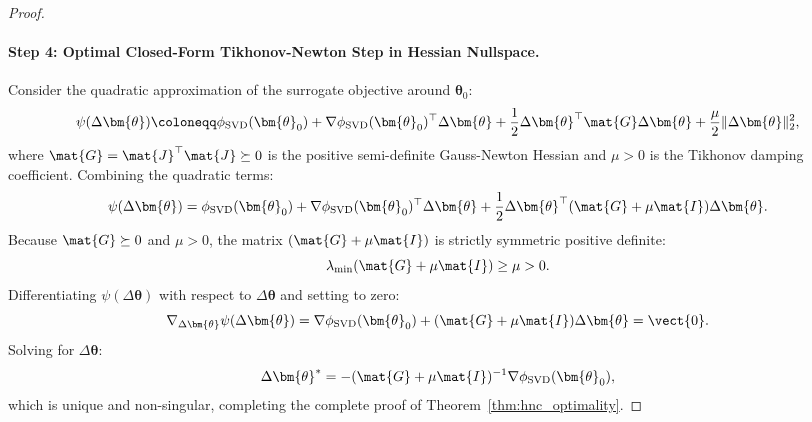 \begin{proof}
\paragraph{Step 4: Optimal Closed-Form Tikhonov-Newton Step in Hessian Nullspace.}
Consider the quadratic approximation of the surrogate objective around $\bm{\theta}_0$:
\begin{equation}
\psi(\Delta\bm{\theta}) \coloneqq \phi_{\text{SVD}}(\bm{\theta}_0) + \nabla \phi_{\text{SVD}}(\bm{\theta}_0)^\top \Delta\bm{\theta} + \frac{1}{2} \Delta\bm{\theta}^\top \mat{G} \Delta\bm{\theta} + \frac{\mu}{2} \|\Delta\bm{\theta}\|_2^2,
\end{equation}
where $\mat{G} = \mat{J}^\top \mat{J} \succeq 0$ is the positive semi-definite Gauss-Newton Hessian and $\mu > 0$ is the Tikhonov damping coefficient.
Combining the quadratic terms:
\begin{equation}
\psi(\Delta\bm{\theta}) = \phi_{\text{SVD}}(\bm{\theta}_0) + \nabla \phi_{\text{SVD}}(\bm{\theta}_0)^\top \Delta\bm{\theta} + \frac{1}{2} \Delta\bm{\theta}^\top (\mat{G} + \mu \mat{I}) \Delta\bm{\theta}.
\end{equation}
Because $\mat{G} \succeq 0$ and $\mu > 0$, the matrix $(\mat{G} + \mu \mat{I})$ is strictly symmetric positive definite:
\begin{equation}
\lambda_{\min}(\mat{G} + \mu \mat{I}) \ge \mu > 0.
\end{equation}
Differentiating $\psi(\Delta\bm{\theta})$ with respect to $\Delta\bm{\theta}$ and setting to zero:
\begin{equation}
\nabla_{\Delta\bm{\theta}} \psi(\Delta\bm{\theta}) = \nabla \phi_{\text{SVD}}(\bm{\theta}_0) + (\mat{G} + \mu \mat{I}) \Delta\bm{\theta} = \vect{0}.
\end{equation}
Solving for $\Delta\bm{\theta}$:
\begin{equation}
\Delta\bm{\theta}^* = -(\mat{G} + \mu \mat{I})^{-1} \nabla \phi_{\text{SVD}}(\bm{\theta}_0),
\end{equation}
which is unique and non-singular, completing the complete proof of Theorem~\ref{thm:hnc_optimality}.
\end{proof}

